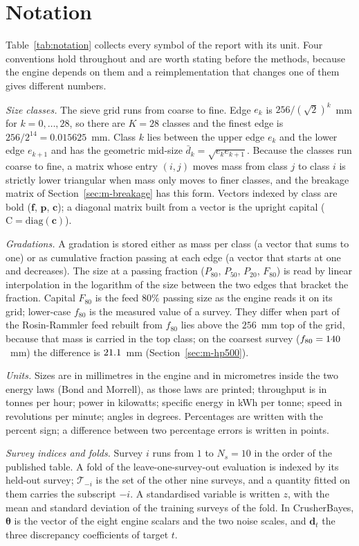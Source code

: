 \section{Notation}\label{sec:notation}

Table~\ref{tab:notation} collects every symbol of the report with its unit. Four conventions hold throughout and are worth
stating before the methods, because the engine depends on them and a reimplementation that changes one of them gives
different numbers.

\emph{Size classes.} The sieve grid runs from coarse to fine. Edge $e_k$ is $256/(\sqrt2)^{k}$~mm for $k=0,\dots,28$, so
there are $K=28$ classes and the finest edge is $256/2^{14}=0.015625$~mm. Class $k$ lies between the upper edge $e_k$ and
the lower edge $e_{k+1}$ and has the geometric mid-size $\bar d_k=\sqrt{e_k e_{k+1}}$. Because the classes run coarse to
fine, a matrix whose entry $(i,j)$ moves mass from class $j$ to class $i$ is strictly lower triangular when mass only moves
to finer classes, and the breakage matrix of Section~\ref{sec:m-breakage} has this form. Vectors indexed by class are bold
($\mathbf f$, $\mathbf p$, $\mathbf c$); a diagonal matrix built from a vector is the upright capital ($\mathrm C=\mathrm{diag}(\mathbf c)$).

\emph{Gradations.} A gradation is stored either as mass per class (a vector that sums to one) or as cumulative fraction
passing at each edge (a vector that starts at one and decreases). The size at a passing fraction ($P_{80}$, $P_{50}$,
$P_{20}$, $F_{80}$) is read by linear interpolation in the logarithm of the size between the two edges that bracket the
fraction. Capital $F_{80}$ is the feed $80\%$ passing size as the engine reads it on its grid; lower-case $f_{80}$ is the
measured value of a survey. They differ when part of the Rosin-Rammler feed rebuilt from $f_{80}$ lies above the $256$~mm top
of the grid, because that mass is carried in the top class; on the coarsest survey ($f_{80}=140$~mm) the difference is
$21.1$~mm (Section~\ref{sec:m-hp500}).

\emph{Units.} Sizes are in millimetres in the engine and in micrometres inside the two energy laws (Bond and Morrell), as
those laws are printed; throughput is in tonnes per hour; power in kilowatts; specific energy in kWh per tonne; speed in
revolutions per minute; angles in degrees. Percentages are written with the percent sign; a difference between two
percentage errors is written in points.

\emph{Survey indices and folds.} Survey $i$ runs from $1$ to $N_s=10$ in the order of the published table. A fold of the
leave-one-survey-out evaluation is indexed by its held-out survey; $\mathcal T_{-i}$ is the set of the other nine surveys,
and a quantity fitted on them carries the subscript $-i$. A standardised variable is written $z$, with the mean and
standard deviation of the training surveys of the fold. In CrusherBayes, $\boldsymbol\theta$ is the vector of the eight
engine scalars and the two noise scales, and $\mathbf d_t$ the three discrepancy coefficients of target $t$.

